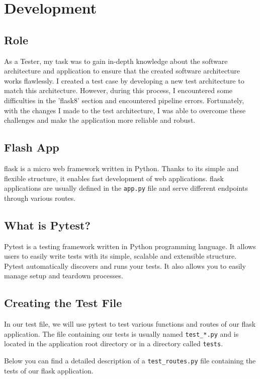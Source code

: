 \section{Development}

\subsection{Role}
As a Tester, my task was to gain in-depth knowledge about the software architecture and application to ensure that the created software architecture works flawlessly. I created a test case by developing a new test architecture to match this architecture. However, during this process, I encountered some difficulties in the 'flask8' section and encountered pipeline errors. Fortunately, with the changes I made to the test architecture, I was able to overcome these challenges and make the application more reliable and robust.

\subsection{Flash App}
flask is a micro web framework written in Python. Thanks to its simple and flexible structure, it enables fast development of web applications. flask applications are usually defined in the \texttt{app.py}  file and serve different endpoints through various routes.

\subsection{What is Pytest?}
Pytest is a testing framework written in Python programming language. It allows users to easily write tests with its simple, scalable and extensible structure. Pytest automatically discovers and runs your tests. It also allows you to easily manage setup and teardown processes.

\subsection{Creating the Test File}

In our test file, we will use pytest to test various functions and routes of our flask application. The file containing our tests is usually named \texttt{test\_*.py} and is located in the application root directory or in a directory called \texttt{tests}.

Below you can find a detailed description of a \texttt{test\_routes.py} file containing the tests of our flask application.


